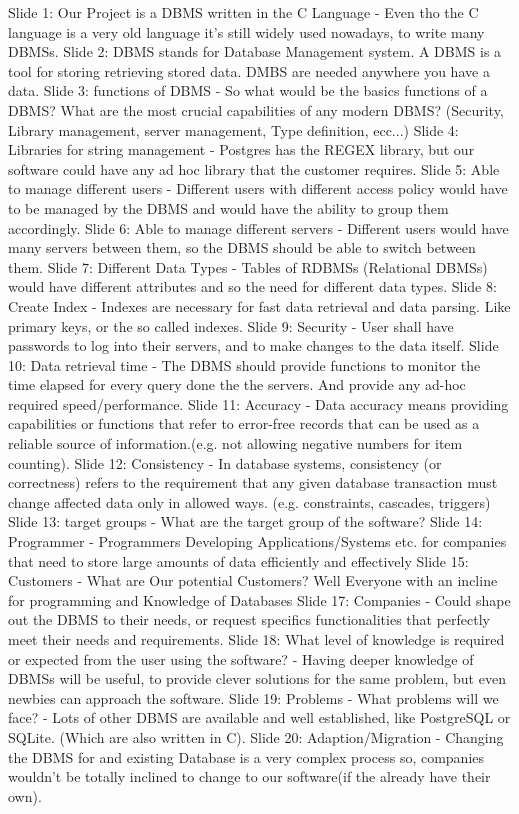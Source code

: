Slide 1:
	Our Project is a DBMS written in the C Language - Even tho the C language is a very old language it's still widely used nowadays, to write many DBMSs.
Slide 2:
	DBMS stands for Database Management system. A DBMS is a tool for storing retrieving stored data. DMBS are needed anywhere you have a data.
Slide 3:
	functions of DBMS -  So what would be the basics functions of a DBMS? What are the most crucial capabilities of any modern DBMS? (Security, Library management, server management, Type definition, ecc...)
Slide 4:
	Libraries for string management - Postgres has the REGEX library, but our software could have any ad hoc library that the customer requires. 
Slide 5:
	Able to manage different users - Different users with different access policy would have to be managed by the DBMS and would have the ability to group them accordingly.
Slide 6:
	Able to manage different servers - Different users would have many servers between them, so the DBMS should be able to switch between them.
Slide 7:
	Different Data Types - Tables of RDBMSs (Relational DBMSs) would have different attributes and so the need for different data types. %
Slide 8:
	Create Index - Indexes are necessary for fast data retrieval and data parsing. Like primary keys, or the so called indexes. 
Slide 9:
	Security - User shall have passwords to log into their servers, and to make changes to the data itself.
Slide 10:
	 Data retrieval time - The DBMS should provide functions to monitor the time elapsed for every query done the the servers. And provide any ad-hoc required speed/performance. 
Slide 11:
	Accuracy - Data accuracy means providing capabilities or functions that refer to error-free records that can be used as a reliable source of information.(e.g. not allowing negative numbers for item counting).
Slide 12:
	Consistency - In database systems, consistency (or correctness) refers to the requirement that any given database transaction must change affected data only in allowed ways. (e.g. constraints, cascades, triggers)
Slide 13:
	target groups - What are the target group of the software? 
Slide 14: 
	Programmer - Programmers Developing Applications/Systems etc. for companies that need to store large amounts of data efficiently and effectively 
Slide 15:
	Customers - What are Our potential Customers? Well Everyone with an incline for programming and Knowledge of Databases
Slide 17:
	Companies - Could shape out the DBMS to their needs, or request specifics functionalities that perfectly meet their needs and requirements. 
Slide 18:
	What level of knowledge is required or expected from the user using the software? - Having deeper knowledge of DBMSs will be useful, to provide clever solutions for the same problem, but even newbies can approach the software.
Slide 19:
	Problems - What problems will we face? - Lots of other DBMS are available and well established, like PostgreSQL or SQLite. (Which are also written in C).
Slide 20: 
	Adaption/Migration - Changing the DBMS for and existing Database is a very complex process so, companies wouldn't be totally inclined to change to our software(if the already have their own).